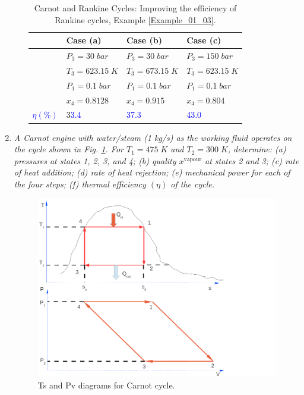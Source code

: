 \begin{enumerate}
\begin{enumerate}
\begin{table}
\begin{center}
\begin{tabular}{c |l l l }
\hline
          &  {\bf Case (a)}      &  {\bf Case (b) }     &  {\bf Case (c) }    \\ 
\hline 
          &   $P_{3}=30\;bar$     &  $P_{3}=30\;bar$     &  $P_{3}=150\;bar$    \\
          &   $T_{3}=623.15\;K$   &  $T_{3}=673.15\;K$   &  $T_{3}=623.15\;K$   \\
          &   $P_{1}=0.1\;bar$    &  $P_{1}=0.1\;bar$    &  $P_{1}=0.1\;bar$    \\
          &   $x_{4}=0.8128$      &   $x_{4}=0.915$      &  $x_{4}=0.804$       \\
\hline
\textcolor{blue}{$\eta \left(\%\right)$} &3\textcolor{blue}{3.4} &\textcolor{blue}{37.3}& \textcolor{blue}{43.0}      \\
\end{tabular}
\end{center}
\caption{Carnot and Rankine Cycles: Improving the efficiency of Rankine cycles, Example \ref{Example_01_03}.}
\label{Example01_01:Table2}
\end{table}



\end{enumerate}


\item {\it A Carnot engine with water/steam (1 kg/s) as the working fluid operates on the cycle shown in Fig. \ref{PVTSDiags}. For $T_{1}=475\;K$ and $T_{2}=300\;K$, determine: (a) pressures at states 1, 2, 3, and 4; (b) quality $x^{\text{vapour}}$ at states 2 and 3; (c) rate of heat addition; (d) rate of heat rejection; (e) mechanical power for each of the four steps; (f) thermal efficiency $\left(\eta\right)$ of the cycle.}
   \begin{figure}[h]
    \begin{center}
     \includegraphics[width=12.cm,clip]{./../../ThermalEngines/Pics/Carnot_PV_TS}
    \end{center}
    \caption{Ts and Pv diagrams for Carnot cycle.}\label{PVTSDiags}
   \end{figure}    


\end{enumerate}
